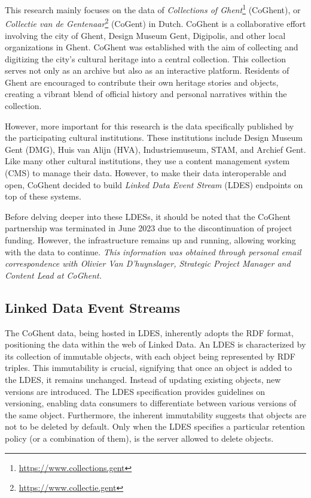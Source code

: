 This research mainly focuses on the data of \textit{Collections of Ghent}\footnote{\url{https://www.collections.gent}} (CoGhent), or \textit{Collectie van de Gentenaar}\footnote{\url{https://www.collectie.gent}} (CoGent) in Dutch. CoGhent is a collaborative effort involving the city of Ghent, Design Museum Gent, Digipolis, and other local organizations in Ghent. CoGhent was established with the aim of collecting and digitizing the city's cultural heritage into a central collection. This collection serves not only as an archive but also as an interactive platform. Residents of Ghent are encouraged to contribute their own heritage stories and objects, creating a vibrant blend of official history and personal narratives within the collection. \citep{leemputten2022gent} \citep{schouppe2022gent}

However, more important for this research is the data specifically published by the participating cultural institutions. These institutions include Design Museum Gent (DMG), Huis van Alijn (HVA), Industriemuseum, STAM, and Archief Gent. Like many other cultural institutions, they use a content management system (CMS) to manage their data. However, to make their data interoperable and open, CoGhent decided to build \textit{Linked Data Event Stream} (LDES) endpoints on top of these systems. \citep{floreverk2022coghent} \citep{van2022publishing}

Before delving deeper into these LDESs, it should be noted that the CoGhent partnership was terminated in June 2023 due to the discontinuation of project funding. However, the infrastructure remains up and running, allowing working with the data to continue. \textit{This information was obtained through personal email correspondence with Olivier Van D'huynslager, Strategic Project Manager and Content Lead at CoGhent.}

\subsection{Linked Data Event Streams}
\label{subsec:ldes}

The CoGhent data, being hosted in LDES, inherently adopts the RDF format, positioning the data within the web of Linked Data. An LDES is characterized by its collection of immutable objects, with each object being represented by RDF triples. This immutability is crucial, signifying that once an object is added to the LDES, it remains unchanged. Instead of updating existing objects, new versions are introduced. The LDES specification provides guidelines on versioning, enabling data consumers to differentiate between various versions of the same object. Furthermore, the inherent immutability suggests that objects are not to be deleted by default. Only when the LDES specifies a particular retention policy (or a combination of them), is the server allowed to delete objects. \citep{colpaert2023ldes}


